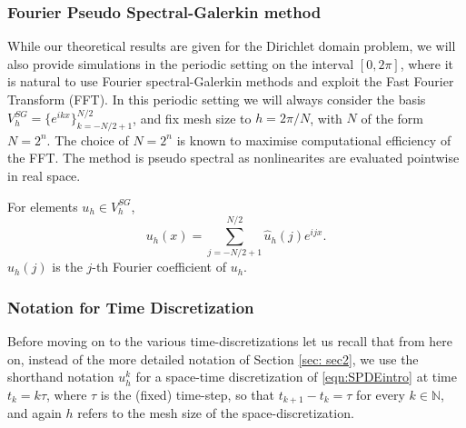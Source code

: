 \documentclass[reqno, 11pt]{amsart}
\newcommand{\gsnote}[1]{\textcolor{Cerulean}{#1}}
\newcommand{\Cannote}[1]{\textcolor{blue}{#1}}
\theoremstyle{plain}
\theoremstyle{definition}
\theoremstyle{remark}
\numberwithin{equation}{section}
\numberwithin{theorem}{section}
\newcommand{\N}{\mathbb{N}}
\begin{document}
{\subsubsection{Fourier Pseudo Spectral-Galerkin method}
\label{s:fft}
While our theoretical results are given for the Dirichlet domain problem, we will also provide simulations in the periodic setting on the interval $[0, 2\pi]$,  where it is natural to use Fourier spectral-Galerkin methods and exploit the Fast Fourier Transform (FFT). In this periodic setting we will always consider the basis $V_h^{SG} = \{e^{ikx} \}_{k=-N/2+1}^{N/2}$, 
and fix  mesh size to $h=2\pi/ N$, with $N$ of the form $N=2^{n}$.  The choice of $N = 2^n$ is known to maximise computational efficiency of the FFT.   The method is pseudo spectral as nonlinearites are evaluated pointwise in real space.

For elements $u_h \in V_h^{SG}$,
\begin{equation}
\label{e:specgalerkin}
    u_h(x) = \sum_{j=-N/2+1}^{N/2} \hat{u}_{h}(j) e^{i j x}.
\end{equation}
$\hat{u}_{h}(j)$ is the $j$-th Fourier coefficient of $u_h$.   

\subsubsection{Notation for Time Discretization}

Before moving on to the various time-discretizations let us recall that from here on, instead of the more detailed notation of Section \ref{sec: sec2}, we use the shorthand  notation $u_h^{k}$ for a space-time discretization of \eqref{eqn:SPDEintro} at time $t_k = k\tau$,  where $\tau$ is the (fixed) time-step, so that $t_{k+1}-t_k = \tau$ for every $k\in\N$, and again $h$ refers to the mesh size of the space-discretization.  



}
\end{document}
